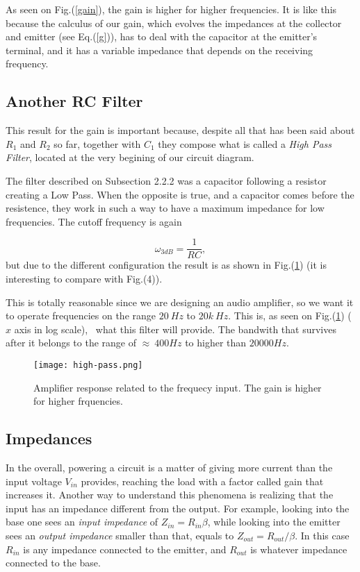 \documentclass{article}
\begin{document}
{As seen on Fig.(\ref{gain}), the gain is higher for higher
frequencies. It is like this because the calculus of our gain, which
evolves the impedances at the collector and emitter (see Eq.(\ref{g})), has to deal with the
capacitor at the emitter's terminal, and it has a variable impedance that
depends on the receiving frequency. 

\subsection{Another RC Filter}

This result for the gain is important because, despite all that has been
said about $R_{1}$ and $R_{2}$ so far, together with
$C_{1}$ they compose what is called a \emph{High Pass Filter}, located
at the very begining of our circuit diagram.

The filter described on Subsection 2.2.2 was a
capacitor following a resistor creating a Low Pass. When the opposite is
true, and a capacitor comes before the resistence, they work in such a
way to have a maximum impedance for low frequencies. The cutoff
frequency is again 

\begin{equation}
\omega_{3dB}=\frac{1}{RC}, 
\label{3dB2}
\end{equation}
but due to the different configuration the result is as shown in
Fig.(\ref{high}) (it is interesting to compare with Fig.(4)).

This is totally reasonable since we are designing an audio amplifier, so
we want it to operate frequencies on the range $20 \ Hz$ to $20k \
Hz$. This is, as seen on Fig.(\ref{high}) ($x$ axis in log scale), \
what this filter will provide. The bandwith that survives after it
belongs to the range of $\approx \ 400Hz$ to higher than $20000 Hz$.

\begin{figure}[H]
\center
\texttt{[image: high-pass.png]}
\caption {Amplifier response related to the frequecy input. The gain is
  higher for higher frquencies.} 
\label{high}
\end{figure}

\subsection{Impedances}

In the overall, powering a circuit is a matter of giving more current than the input
voltage $V_{in}$ provides, reaching the load with a
factor called gain that increases it. Another way to understand this
phenomena is realizing that the input has an impedance different from the
output. For example, looking into the base one sees an \emph{input impedance} of
$Z_{in}=R_{in} \beta$, while looking into the emitter sees an \emph{output impedance}
smaller than that, equals to $Z_{out}=R_{out}/\beta$. In this case
$R_{in}$ is any impedance connected to the emitter, and $R_{out}$ is
whatever impedance connected to the base. 

}
\end{document}
